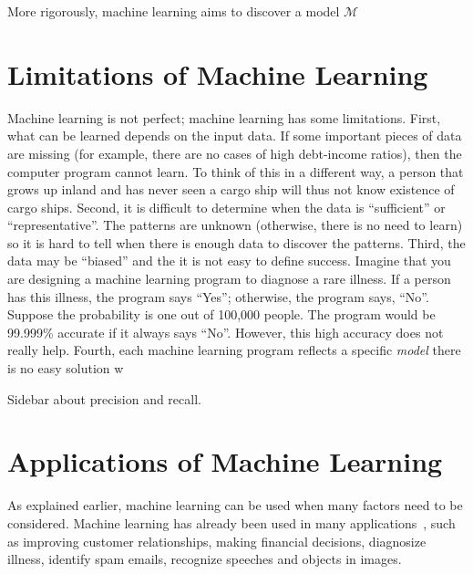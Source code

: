 More rigorously, machine learning aims to discover
a model $\mathcal{M}$ 


\section{Limitations of Machine Learning}

Machine learning is not perfect; machine learning has some
limitations.  First, what can be learned depends on the input data. If
some important pieces of data are missing (for example, there are no
cases of high debt-income ratios), then the computer program cannot
learn.  To think of this in a different way, a person that grows up
inland and has never seen a cargo ship will thus not know existence of
cargo ships.  Second, it is difficult to determine when the data is
``sufficient'' or ``representative''.  The patterns are unknown
(otherwise, there is no need to learn) so it is hard to tell when
there is enough data to discover the patterns.  Third, the data may be
``biased'' and the it is not easy to define success. Imagine that you
are designing a machine learning program to diagnose a rare illness.
If a person has this illness, the program says ``Yes''; otherwise, the
program says, ``No''.  Suppose the probability is one out of 100,000
people.  The program would be 99.999\% accurate if it always says
``No''.  However, this high accuracy does not really help.
Fourth, each machine learning program reflects a specific {\it model}
there is no easy solution w



Sidebar about precision and recall.


\section{Applications of Machine Learning}

As explained earlier, machine learning can be used when many factors
need to be considered.  Machine learning has already been used in many
applications~\cite{Alpaydin2010IntroductiontoMachine}, such as
improving customer relationships, making financial decisions,
diagnosize illness, identify spam emails, recognize speeches and
objects in images.
